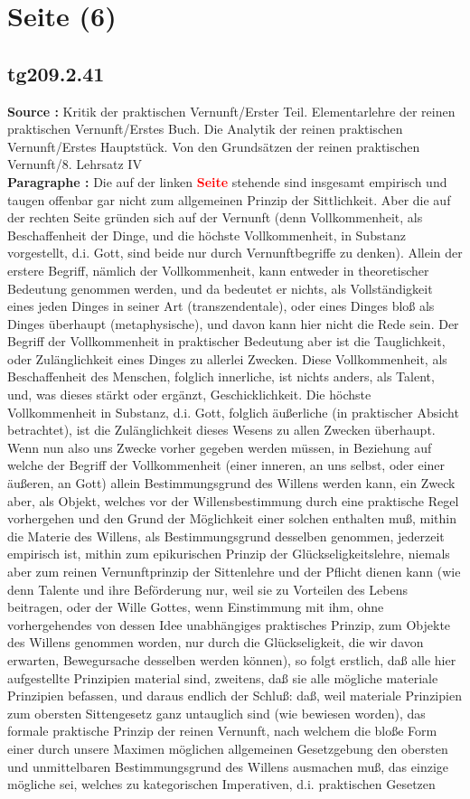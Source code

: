 \documentclass[a4paper,12pt,twoside]{book}
\newcommand{\match}[1]{\textcolor{red}{\textbf{#1}}}
\newcommand{\unnumberedsection}[1]{
	\section*{#1}
	\addcontentsline{toc}{section}{#1}
	\markright{#1}
}
\begin{document}
	\unnumberedsection{Seite (6)} 
	\subsection*{tg209.2.41} 
	\textbf{Source : }Kritik der praktischen Vernunft/Erster Teil. Elementarlehre der reinen praktischen Vernunft/Erstes Buch. Die Analytik der reinen praktischen Vernunft/Erstes Hauptstück. Von den Grundsätzen der reinen praktischen Vernunft/8. Lehrsatz IV\\  
	
	\noindent\textbf{Paragraphe : }Die auf der linken \match{Seite} stehende sind insgesamt empirisch und taugen offenbar gar nicht zum allgemeinen Prinzip der Sittlichkeit. Aber die auf der rechten Seite gründen sich auf der Vernunft (denn Vollkommenheit, als Beschaffenheit der Dinge, und die höchste Vollkommenheit, in Substanz vorgestellt, d.i. Gott, sind beide nur durch Vernunftbegriffe zu denken). Allein der erstere Begriff, nämlich der Vollkommenheit, kann entweder in theoretischer Bedeutung genommen werden, und da bedeutet er nichts, als Vollständigkeit eines jeden Dinges in seiner Art (transzendentale), oder eines Dinges bloß als Dinges überhaupt (metaphysische), und davon kann hier nicht die Rede sein. Der Begriff der Vollkommenheit in praktischer Bedeutung aber ist die Tauglichkeit, oder Zulänglichkeit eines Dinges zu allerlei Zwecken. Diese Vollkommenheit, als Beschaffenheit des Menschen, folglich innerliche, ist nichts anders, als Talent, und, was dieses stärkt oder ergänzt, Geschicklichkeit. Die höchste Vollkommenheit in Substanz, d.i. Gott, folglich äußerliche (in praktischer Absicht betrachtet), ist die Zulänglichkeit dieses Wesens zu allen Zwecken überhaupt. Wenn nun also uns Zwecke vorher gegeben werden müssen, in Beziehung auf welche der Begriff der Vollkommenheit (einer inneren, an uns selbst, oder einer äußeren, an Gott) allein Bestimmungsgrund des Willens werden kann, ein Zweck aber, als Objekt, welches vor der Willensbestimmung durch eine praktische Regel vorhergehen und den Grund der Möglichkeit einer solchen enthalten muß, mithin die Materie des Willens, als Bestimmungsgrund desselben genommen, jederzeit empirisch ist, mithin zum epikurischen Prinzip der Glückseligkeitslehre, niemals aber zum reinen Vernunftprinzip der Sittenlehre und der Pflicht dienen kann (wie denn Talente und ihre Beförderung nur, weil sie zu Vorteilen des Lebens beitragen, oder der Wille Gottes, wenn Einstimmung mit ihm, ohne vorhergehendes von dessen Idee unabhängiges praktisches Prinzip, zum Objekte des Willens genommen worden, nur durch die Glückseligkeit, die wir davon erwarten, Bewegursache desselben werden können), so folgt erstlich, daß alle hier aufgestellte Prinzipien material sind, zweitens, daß sie alle mögliche materiale Prinzipien befassen, und daraus endlich der Schluß: daß, weil materiale Prinzipien zum obersten Sittengesetz ganz untauglich sind (wie bewiesen worden), das formale praktische Prinzip der reinen Vernunft, nach welchem die bloße Form einer durch  unsere Maximen möglichen allgemeinen Gesetzgebung den obersten und unmittelbaren Bestimmungsgrund des Willens ausmachen muß, das einzige mögliche sei, welches zu kategorischen Imperativen, d.i. praktischen Gesetzen 
\end{document}
